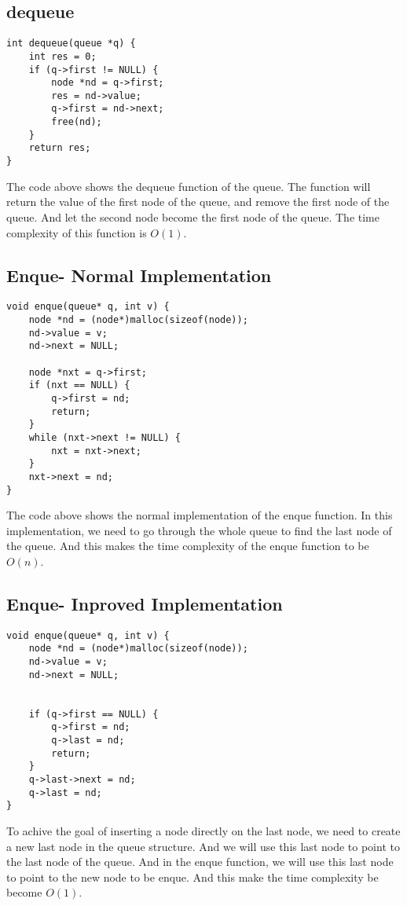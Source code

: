 \subsection*{dequeue}
\begin{verbatim}
int dequeue(queue *q) {
    int res = 0;
    if (q->first != NULL) {
        node *nd = q->first;
        res = nd->value;
        q->first = nd->next;
        free(nd);
    }
    return res;
}
\end{verbatim}
The code above shows the dequeue function of the queue. The function will return the value of the first node of the queue, and remove the first node of the queue. And let the second node become the first node of the queue. The time complexity of this function is $O(1)$.

\subsection*{Enque- Normal Implementation}
\begin{verbatim}
void enque(queue* q, int v) {
    node *nd = (node*)malloc(sizeof(node));
    nd->value = v;
    nd->next = NULL;

    node *nxt = q->first;
    if (nxt == NULL) {
        q->first = nd;
        return;
    }
    while (nxt->next != NULL) {
        nxt = nxt->next;
    }
    nxt->next = nd;
}
\end{verbatim}
The code above shows the normal implementation of the enque function. In this implementation, we need to go through the whole queue to find the last node of the queue. And this makes the time complexity of the enque function to be $O(n)$.

\subsection*{Enque- Inproved Implementation}
\begin{verbatim}
void enque(queue* q, int v) {
    node *nd = (node*)malloc(sizeof(node));
    nd->value = v;
    nd->next = NULL;

    
    if (q->first == NULL) {
        q->first = nd;
        q->last = nd;
        return;
    }
    q->last->next = nd;
    q->last = nd;
}
\end{verbatim}
To achive the goal of inserting a node directly on the last node, we need to create a new last node in the queue structure. And we will use this last node to point to the last node of the queue. And in the enque function, we will use this last node to point to the new node to be enque. And this make the time complexity be become $O(1)$.


